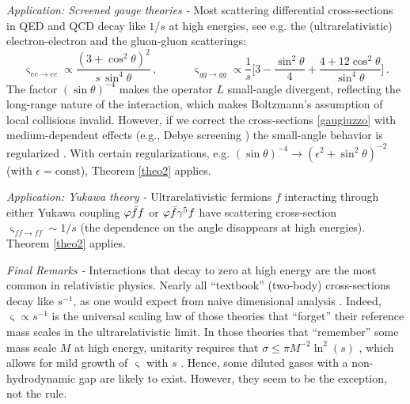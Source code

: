\documentclass[a4paper, amsfonts, amssymb, amsmath, reprint, showkeys, nofootinbib, twoside, onecolumn,notitlepage,,longbibliography]{revtex4-2}
\newcommand{\spc}{\quad \quad \quad}
\theoremstyle{definition}
\theoremstyle{theorem}
\theoremstyle{corollary}
\begin{document}
\noindent \textit{Application: Screened gauge theories -} Most scattering differential cross-sections in QED \cite{Minten:1969} and QCD \cite{Arnold2003} decay like $1/s$ at high energies, see e.g. the (ultrarelativistic) electron-electron and the gluon-gluon scatterings:
\begin{equation}\label{gaugiuzzo}
\upvarsigma_{ee \rightarrow ee} \propto  \dfrac{(3{+}\cos^2 \! \theta)^2}{s \, \sin^4 \! \theta} \, , \spc
\upvarsigma_{gg \rightarrow gg} \propto  \dfrac{1}{s} \bigg[ 3-\dfrac{\sin^2 \! \theta}{4} +  \dfrac{4{+}12\cos^2 \! \theta}{\sin^4 
 \! \theta} \bigg] \, . 
\end{equation}
The factor $(\sin \theta)^{-4}$ makes the operator $L$ small-angle divergent, reflecting the long-range nature of the interaction, which makes Boltzmann's assumption of local collisions invalid. However, if we correct the cross-sections \eqref{gaugiuzzo} with medium-dependent effects (e.g., Debye screening \cite{bellan_2006}) the small-angle behavior is regularized \cite{messiah1961quantum,Arnold2003}. With certain regularizations, e.g. $(\sin  \theta)^{-4} \rightarrow (\epsilon^2{+}\sin^2 \! \theta)^{-2}$ (with $\epsilon=\text{const}$), Theorem \ref{theo2} applies.

\newpage

\noindent \textit{Application: Yukawa theory -} Ultrarelativistic fermions $f$ interacting through either Yukawa coupling $ \varphi \Bar{f}f$ or $\varphi \Bar{f}\gamma^5 f$ have scattering cross-section $\upvarsigma_{ff \rightarrow ff} \sim 1/s$ \cite{Srednicki:2007qs,Al-Bakri:2023kcr} (the dependence on the angle disappears at high energies).
Theorem \ref{theo2} applies.

\noindent \textit{Final Remarks -} Interactions that decay to zero at high energy are the most common in relativistic physics. Nearly all ``textbook'' (two-body) cross-sections decay like $s^{-1}$, as one would expect from naive dimensional analysis \cite{Peskin_book}. Indeed, $\upvarsigma \propto s^{-1}$ is the universal scaling law of those theories that ``forget'' their reference mass scales in the ultrarelativistic limit. In those theories that ``remember'' some mass scale $M$ at high energy, unitarity requires that $\sigma \leq \pi M^{-2}\ln^2(s)$ \cite{Castaldi:1983hrk}, which allows for mild growth of $\upvarsigma$ with $s$ \cite{Kupsch:1982aa}. Hence, some diluted gases with a non-hydrodynamic gap are likely to exist. However, they seem to be the exception, not the rule.
\end{document}
